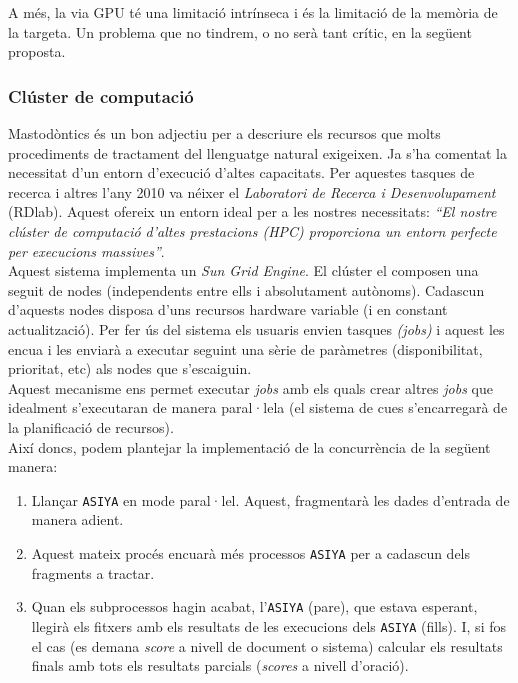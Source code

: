\documentclass[11pt,a4paper]{article}
\begin{document}
A més, la via GPU té una limitació intrínseca i és la limitació de la memòria de la targeta. Un problema que no tindrem, o no serà tant crític, en la següent proposta.

\subsubsection{Clúster de computació}
Mastodòntics és un bon adjectiu per a descriure els recursos que molts procediments de tractament del llenguatge natural exigeixen. Ja s'ha comentat la necessitat d'un entorn d'execució d'altes capacitats. Per aquestes tasques de recerca i altres l'any 2010 va néixer el \textit{Laboratori de Recerca i Desenvolupament} (RDlab). Aquest ofereix un entorn ideal per a les nostres necessitats: \textit{``El nostre clúster de computació d'altes prestacions (HPC) proporciona un entorn perfecte per execucions massives''}\cite{cluster}.
\\

Aquest sistema implementa un \textit{Sun Grid Engine}. El clúster el composen una seguit de nodes (independents entre ells i absolutament autònoms). Cadascun d'aquests nodes disposa d'uns recursos hardware variable (i en constant actualització). Per fer ús del sistema els usuaris envien tasques \textit{(jobs)} i aquest les encua i les enviarà a executar seguint una sèrie de paràmetres (disponibilitat, prioritat, etc) als nodes que s'escaiguin.
\\

Aquest mecanisme ens permet executar \textit{jobs} amb els quals crear altres \textit{jobs} que idealment s'executaran de manera paral·lela (el sistema de cues s'encarregarà de la planificació de recursos).
\\

Així doncs, podem plantejar la implementació de la concurrència de la següent manera: 
\begin{enumerate}[1.]
    \item Llançar \texttt{ASIYA} en mode paral·lel. Aquest, fragmentarà les dades d'entrada de manera adient.
    
    \item Aquest mateix procés encuarà més processos \texttt{ASIYA} per a cadascun dels fragments a tractar.
    
    \item Quan els subprocessos hagin acabat, l'\texttt{ASIYA} (pare), que estava esperant, llegirà els fitxers amb els resultats de les execucions dels \texttt{ASIYA} (fills). I, si fos el cas (es demana \emph{score} a nivell de document o sistema) calcular els resultats finals amb tots els resultats parcials (\emph{scores} a nivell d'oració).
\end{enumerate}
\end{document}
